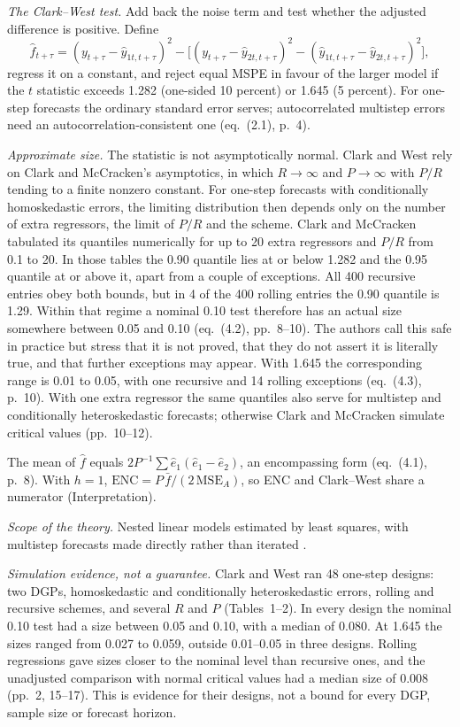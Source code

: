 \begin{qfmethod}
\emph{The Clark--West test.} Add back the noise term and test whether the adjusted difference is positive. Define
\[ \hat f_{t+\tau}=(y_{t+\tau}-\hat y_{1t,t+\tau})^2-\bigl[(y_{t+\tau}-\hat y_{2t,t+\tau})^2-(\hat y_{1t,t+\tau}-\hat y_{2t,t+\tau})^2\bigr], \]
regress it on a constant, and reject equal MSPE in favour of the larger model if the $t$ statistic exceeds 1.282 (one-sided 10 percent) or 1.645 (5 percent). For one-step forecasts the ordinary standard error serves; autocorrelated multistep errors need an autocorrelation-consistent one (eq.~(2.1), p.~4).

\emph{Approximate size.} The statistic is not asymptotically normal. Clark and West rely on Clark and McCracken's asymptotics, in which $R\to\infty$ and $P\to\infty$ with $P/R$ tending to a finite nonzero constant. For one-step forecasts with conditionally homoskedastic errors, the limiting distribution then depends only on the number of extra regressors, the limit of $P/R$ and the scheme. Clark and McCracken tabulated its quantiles numerically for up to 20 extra regressors and $P/R$ from 0.1 to 20. In those tables the 0.90 quantile lies at or below 1.282 and the 0.95 quantile at or above it, apart from a couple of exceptions. All 400 recursive entries obey both bounds, but in 4 of the 400 rolling entries the 0.90 quantile is 1.29. Within that regime a nominal 0.10 test therefore has an actual size somewhere between 0.05 and 0.10 (eq.~(4.2), pp.~8--10). The authors call this safe in practice but stress that it is not proved, that they do not assert it is literally true, and that further exceptions may appear. With 1.645 the corresponding range is 0.01 to 0.05, with one recursive and 14 rolling exceptions (eq.~(4.3), p.~10). With one extra regressor the same quantiles also serve for multistep and conditionally heteroskedastic forecasts; otherwise Clark and McCracken simulate critical values (pp.~10--12).

The mean of $\hat f$ equals $2P^{-1}\sum\hat e_1(\hat e_1-\hat e_2)$, an encompassing form (eq.~(4.1), p.~8). With $h=1$, $\text{ENC}=P\,\bar f/(2\,\mathrm{MSE}_A)$, so ENC and Clark--West share a numerator (Interpretation).

 \emph{Scope of the theory.} Nested linear models estimated by least squares, with multistep forecasts made directly rather than iterated \citep[sec.~4, p.~8]{clark-west-2006-nber}.

\emph{Simulation evidence, not a guarantee.} Clark and West ran 48 one-step designs: two DGPs, homoskedastic and conditionally heteroskedastic errors, rolling and recursive schemes, and several $R$ and $P$ (Tables~1--2). In every design the nominal 0.10 test had a size between 0.05 and 0.10, with a median of 0.080. At 1.645 the sizes ranged from 0.027 to 0.059, outside 0.01--0.05 in three designs. Rolling regressions gave sizes closer to the nominal level than recursive ones, and the unadjusted comparison with normal critical values had a median size of 0.008 (pp.~2, 15--17). This is evidence for their designs, not a bound for every DGP, sample size or forecast horizon.


\end{qfmethod}
